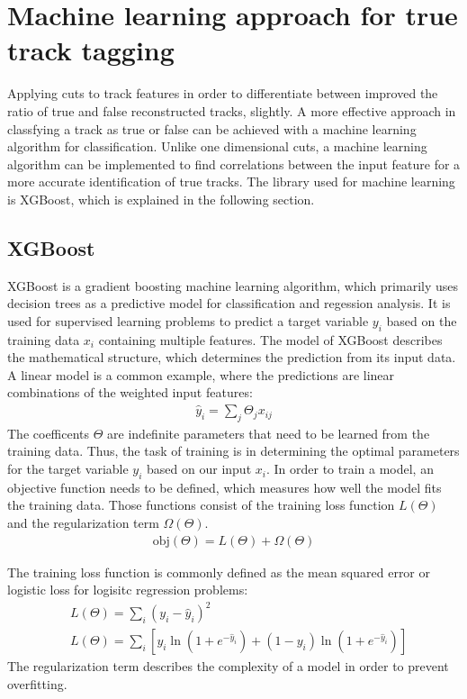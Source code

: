 \chapter{Machine learning approach for true track tagging}
Applying cuts to track features in order to differentiate between improved the ratio of true and false reconstructed tracks, slightly. A more effective
approach in classfying a track as true or false can be achieved with a machine learning algorithm for classification. Unlike one dimensional cuts, a machine learning
algorithm can be implemented to find correlations between the input feature for a more accurate identification of true tracks. The library used for
machine learning is XGBoost, which is explained in the following section. 

\section{XGBoost}
XGBoost \cite{xgboost} is a gradient boosting machine learning algorithm, which primarily uses decision trees as a predictive model for classification and regession analysis.
It is used for supervised learning problems to predict a target variable $y_i$ based on the training data $x_i$ containing multiple features. The model
of XGBoost describes the mathematical structure, which determines the prediction from its input data. A linear model is a common example, where the predictions
are linear combinations of the weighted input features:
\begin{align}
  \hat{y}_i = \sum_j \Theta_j x_{ij}
\end{align}
The coefficents $\Theta$ are indefinite parameters that need to be learned from the training data. Thus, the task of training is in determining the optimal parameters
for the target variable $y_i$ based on our input $x_i$. In order to train a model, an objective function needs to be defined, which measures how well
the model fits the training data. Those functions consist of the training loss function $L(\Theta) $ and the regularization term $\Omega (\Theta)$.
\begin{align}
  \text{obj}(\Theta) = L(\Theta) + \Omega(\Theta)
\end{align}

The training loss function is commonly defined as the mean squared error or logistic loss for logisitc regression problems:
\begin{align}
  &L(\Theta) = \sum_i (y_i - \hat{y}_i)^2 \\
  &L(\Theta) = \sum_i [y_i \ln{(1 + e^{-\hat{y}_i})} + (1 - y_i) \ln{(1 + e^{-\hat{y}_i})}]
\end{align}
The regularization term describes the complexity of a model in order to prevent overfitting.

